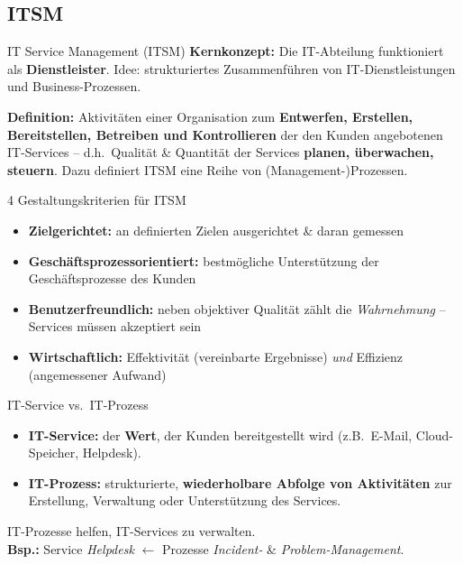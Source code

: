 \documentclass[a4paper, fontsize=7pt]{scrartcl}
\begin{document}
\subsection{ITSM}

\begin{mainbox}{IT Service Management (ITSM)}
\textbf{Kernkonzept:} Die IT-Abteilung funktioniert als
\textbf{Dienstleister}. Idee: strukturiertes Zusammenführen von
IT-Dienstleistungen und Business-Prozessen.

\textbf{Definition:} Aktivitäten einer Organisation zum
\textbf{Entwerfen, Erstellen, Bereitstellen, Betreiben und Kontrollieren}
der den Kunden angebotenen IT-Services -- d.h.\ Qualität \& Quantität der
Services \textbf{planen, überwachen, steuern}. Dazu definiert ITSM eine Reihe
von (Management-)Prozessen.
\end{mainbox}

\begin{mainbox}{4 Gestaltungskriterien für ITSM}
\begin{itemize}
    \item \textbf{Zielgerichtet:} an definierten Zielen ausgerichtet \& daran
          gemessen
    \item \textbf{Geschäftsprozessorientiert:} bestmögliche Unterstützung der
          Geschäftsprozesse des Kunden
    \item \textbf{Benutzerfreundlich:} neben objektiver Qualität zählt die
          \emph{Wahrnehmung} -- Services müssen akzeptiert sein
    \item \textbf{Wirtschaftlich:} Effektivität (vereinbarte Ergebnisse)
          \emph{und} Effizienz (angemessener Aufwand)
\end{itemize}
\end{mainbox}

\begin{mainbox}{IT-Service vs.\ IT-Prozess}
\begin{itemize}
    \item \textbf{IT-Service:} der \textbf{Wert}, der Kunden bereitgestellt
          wird (z.B.\ E-Mail, Cloud-Speicher, Helpdesk).
    \item \textbf{IT-Prozess:} strukturierte, \textbf{wiederholbare Abfolge
          von Aktivitäten} zur Erstellung, Verwaltung oder Unterstützung des
          Services.
\end{itemize}
IT-Prozesse helfen, IT-Services zu verwalten.\\
\textbf{Bsp.:} Service \emph{Helpdesk} $\leftarrow$ Prozesse
\emph{Incident-} \& \emph{Problem-Management}.
\end{mainbox}
\end{document}

